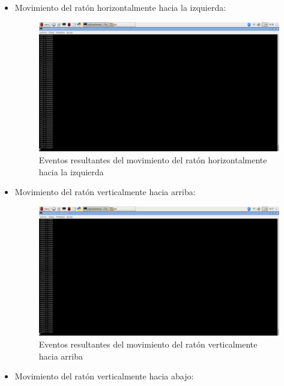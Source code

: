 \begin{itemize}
\begin{itemize}
        \item Movimiento del ratón horizontalmente hacia la izquierda:
        
            \begin{figure}
            \centering
            \includegraphics[scale = 0.25]{capitulo_04/figuras_dir/izquierda.jpg}
            \caption{Eventos resultantes del movimiento del ratón horizontalmente hacia la izquierda}
            \end{figure}
        
        \item Movimiento del ratón verticalmente hacia arriba:
        
            \begin{figure}
            \centering
            \includegraphics[scale = 0.25]{capitulo_04/figuras_dir/arriba.jpg}
            \caption{Eventos resultantes del movimiento del ratón verticalmente hacia arriba}
            \end{figure}
        
        \item Movimiento del ratón verticalmente hacia abajo:
        

\end{itemize}
\end{itemize}
